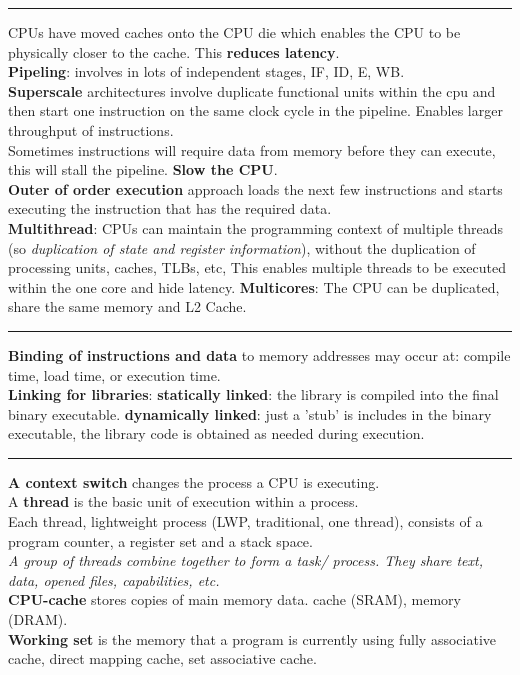 \documentclass[8pt,a4paper,landscape]{article}
\begin{document}
\begin{spacing}{-1}
\begin{multicols*}{3}
\hrule \noindent
CPUs have moved caches onto the CPU die which enables the CPU to be physically closer to the cache. This \textbf{reduces latency}. \\
\textbf{Pipeling}: involves in lots of independent stages, IF, ID, E, WB. \\
\textbf{Superscale} architectures involve duplicate functional units within the cpu and then start one instruction on the same clock cycle in the pipeline. Enables larger throughput of instructions. \\
Sometimes instructions will require data from memory before they can execute, this will stall the pipeline. \textbf{Slow the CPU}. \\
\textbf{Outer of order execution} approach loads the next few instructions and starts executing the instruction that has the required data. \\
\textbf{Multithread}: CPUs can maintain the programming context of multiple threads (so \textit{duplication of state and register information}), without the duplication of processing units, caches, TLBs, etc, This enables multiple threads to be executed within the one core and hide latency. 
\textbf{Multicores}: The CPU can be duplicated, share the same memory and L2 Cache.

\hrule \noindent
\textbf{Binding of instructions and data} to memory addresses may occur at: compile time, load time, or execution time. \\
\textbf{Linking for libraries}:
\textbf{statically linked}: the library is compiled into the final binary executable.
\textbf{dynamically linked}: just a 'stub' is includes in the binary executable, 
the library code is obtained as needed during execution.

\hrule \noindent
\textbf{A context switch} changes the process a CPU is executing. \\
A \textbf{thread} is the basic unit of execution within a process. \\
Each thread, lightweight process (LWP, traditional, one thread), 
consists of a program counter, a register set and a stack space. \\
\textit{A group of threads combine together to form a task/ process. They share text, data, opened files, capabilities, etc.} \\
\textbf{CPU-cache} stores copies of main memory data. cache (SRAM), memory (DRAM). \\
\textbf{Working set} is the memory that a program is currently using
fully associative cache, direct mapping cache, set associative cache. \\


\end{multicols*}
\end{spacing}
\end{document}

